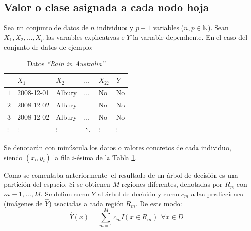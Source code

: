 \documentclass[12pt,twoside]{article}
\begin{document}
\subsection{Valor o clase asignada a cada nodo hoja} \label{sec:2.4}
Sea un conjunto de datos de $n$ individuos y $p+1$ variables ($n,p \in \mathbb{N}$). Sean $X_1, X_2, ... , X_p$ las variables explicativas e $Y$ la variable dependiente. En el caso del conjunto de datos de ejemplo:
\begin{table}[h]
\centering
\begin{tabular}{l|l|l|l|l|l|}
\cline{2-6}
                                                       & \cellcolor[HTML]{C0C0C0}$X_1$ & \cellcolor[HTML]{C0C0C0}$X_2$ & \cellcolor[HTML]{C0C0C0}$\dots$ & \cellcolor[HTML]{C0C0C0}$X_{22}$ & \cellcolor[HTML]{9B9B9B}$Y$ \\ \hline
\multicolumn{1}{|l|}{\cellcolor[HTML]{C0C0C0}$1$}    & 2008-12-01                    & Albury                        & $\dots$                         & No                               & No                          \\ \hline
\multicolumn{1}{|l|}{\cellcolor[HTML]{C0C0C0}$2$}    & 2008-12-02                    & Albury                        & $\dots$                         & No                               & No                          \\ \hline
\multicolumn{1}{|l|}{\cellcolor[HTML]{C0C0C0}$3$}     & 2008-12-02                    & Albury                        & $\dots$                         & No                               & No                          \\ \hline
\multicolumn{1}{|l|}{\cellcolor[HTML]{C0C0C0}$\vdots$} & $\vdots$                      & $\vdots$                      & $\ddots$                        & $\vdots$                         & $\vdots$                    \\ \hline
\end{tabular}
\caption{Datos \textit{``Rain in Australia''}}
\label{tab:Datos}
\end{table}

Se denotarán con minúscula los datos o valores concretos de cada individuo, siendo $(x_i, y_i)$ la fila $i$-ésima de la Tabla \ref{tab:Datos}.

Como se comentaba anteriormente, el resultado de un árbol de decisión es una partición del espacio. Si se obtienen $M$ regiones diferentes, denotadas por $R_{m}$ con $m = 1, ..., M$. Se define como $\hat{Y}$ al árbol de decisión y como $c_m$ a las predicciones (imágenes de $\hat{Y}$) asociadas a cada región $R_m$. De este modo:
\begin{equation*}
\hat{Y}(x) = \sum^M_{m = 1} c_{m}I(x \in R_m) \, \, \, \forall x \in D
\end{equation*}
\end{document}
